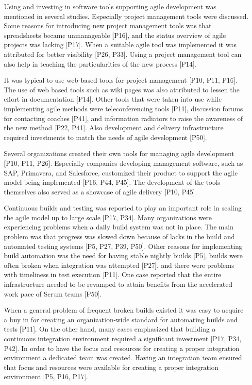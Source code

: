
Using and investing in software tools supporting agile development was mentioned
in several studies. Especially project management tools were discussed.
Some reasons for introducing new project management tools was that spreadsheets
became unmanageable [P16], and the status overview of agile projects was lacking
[P17]. When a suitable agile tool was implemented it was attributed for better
visibility [P26, P33]. Using a project management tool can also help in teaching
the particularities of the new process [P14].

It was typical to use web-based tools for project management [P10, P11, P16].
The use of web based tools such as wiki pages was also attributed to lessen the
effort in documentation [P14]. Other tools that were taken into use while
implementing agile methods were teleconferencing tools [P11], discussion forums
for contacting coaches [P41], and information radiators to raise the awareness
of the new method [P22, P41]. Also development and delivery infrastructure
required investments to match the needs of agile development [P50]. 

Several organizations created their own tools for managing agile development
[P10, P11, P26]. Especially companies developing management software, such as
SAP, Primavera, and Salesforce, customized their product to support the agile
model being implemented [P16, P44, P45]. The development of the tools themselves
also served as a showcase of agile delivery [P10, P45].


Continuous builds and testing was reported to play an important role in scaling
the agile model up to large scale [P17, P34]. Many organizations were
experiencing problems when a daily build system was not in place. The main
problem was that progress was slowed down because of lacks in the build and
automated testing systems [P5, P27, P39, P50].
Other reasons for implementing build automation was the need for having stable
nightly builds [P5], builds were often broken when integration was attempted
[P27], and there were problems with timeliness in test execution [P11]. One case
reported that the entire infrastructure needed to be revamped to attain benefits
from the accelerated work pace of Scrum teams [P50].

When a general problem of frequent broken builds existed it was easy to acquire
a buy in for creating an organization-wide standard for automating builds and
tests [P11]. On the other hand, many cases emphasized that building a continuous
integration environment required a significant investment [P17, P34, P42].
In order to have the focus and resources for creating a proper integration
environment a dedicated team was created. Having an integration team ensured
that focus and resources were available for creating a proper integration
environment [P5, P16, P17].

